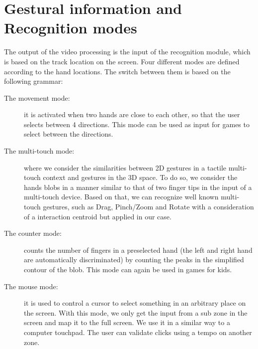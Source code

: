 \documentclass{llncs}
\begin{document}
\section{Gestural information and Recognition modes}
The output of the video processing is the input of the recognition module,
which is based on the track location on the screen.
Four different modes are defined according to the hand locations. The switch between them is based on the following grammar:
\begin{description}
 \item[The movement mode:] it is activated when two hands are close to each other, so that the user selects between 4 directions. This mode can be used as input for games to select between the directions.
 \item[The multi-touch mode:] where we consider the similarities between 2D gestures in a tactile multi-touch context and gestures in the 3D space. To do so, we consider the hands blobs in a manner similar to that of two finger tips in the input of a multi-touch device. Based on that, we can recognize well known multi-touch gestures, such as Drag, Pinch/Zoom and Rotate with a consideration of a interaction centroid\cite{CentroidGest} but applied in our case.
 \item[The counter mode:] counts the number of fingers in a preselected hand (the left and right hand are automatically discriminated) by counting the peaks in the simplified contour of the blob. This mode can again be used in games for kids.
 \item[The mouse mode:] it is used to control a cursor to select something in an arbitrary place on the screen. With this mode, we only get the input from a sub zone in the screen and map it to the full screen. We use it in a similar way to a computer touchpad.
The user can validate clicks using a tempo on another zone.
\end{description}


\end{document}

